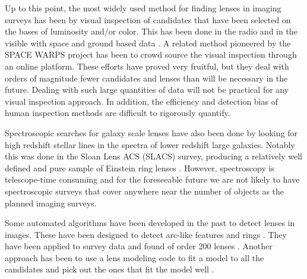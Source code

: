 \documentclass[useAMS,usenatbib]{mnras}
\begin{document}
Up to this point, the most widely used method for finding lenses in imaging surveys has been by visual inspection of candidates that have been selected on the bases of luminosity and/or color.  This has been done in the radio \citep{2003MNRAS.341...13B} and in the visible with space and ground based data \citep{2008MNRAS.389.1311J,2008ApJS..176...19F,2014MNRAS.439.3392P}.  A related method pioneered by the SPACE WARPS project \citep{2016MNRAS.455.1171M,2016MNRAS.455.1191M,2015MNRAS.452..502G} has been to crowd source the visual inspection through an online platform.  These efforts have proved very fruitful, but they deal with orders of magnitude fewer candidates and lenses than will be necessary in the future.  Dealing with such large quantities of data will not be practical for any visual inspection approach.  In addition, the efficiency and detection bias of human inspection methods are difficult to rigorously quantify.

Spectroscopic searches for galaxy scale lenses have also been done by looking for high redshift stellar lines in the spectra of lower redshift large galaxies.  Notably this was done in the Sloan Lens ACS (SLACS) survey, producing a relatively well defined and pure sample of Einstein ring lenses \citep{2006ApJ...638..703B}.  However, spectroscopy is telescope-time consuming and for the foreseeable future we are not likely to have spectroscopic surveys that cover anywhere near the number of objects as the planned imaging surveys.

Some automated algorithms have been developed in the past to detect lenses in images.  These have been designed to detect arc-like features \citep{2006astro.ph..6757A,2007A&A...472..341S, 2017A&A...597A.135B} and rings \citep{2014ApJ...785..144G,2014A&A...566A..63J}.  They have been applied to survey data and found of order 200 lenses \citep{2007A&A...461..813C,2012ApJ...749...38M,2016A&A...592A..75P}.  Another approach has been to use a lens modeling code to fit a model to all the candidates and pick out the ones that fit the model well \citep{2009ApJ...694..924M,2010A&A...517A..25S,2017arXiv170401585S}.
\end{document}
